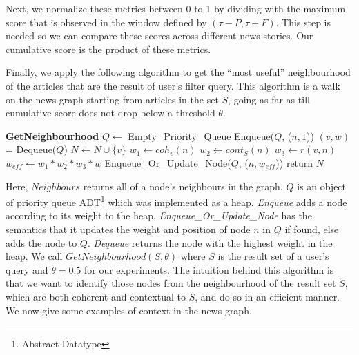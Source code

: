 Next, we normalize these metrics between 0 to 1 by dividing with the maximum score that is observed in the window defined by $(\tau - P, \tau + F)$. This
step is needed so we can compare these scores across different news stories. Our cumulative score is the product of these metrics.

Finally, we apply the following algorithm to get the ``most useful'' neighbourhood of the articles that are the result of user's filter query. This algorithm is a walk on the news graph starting from articles in the set $S$, 
going as far as till cumulative score does not drop below a threshold $\theta$.

\begin{algorithmic}
  \State \textbf{\underline{GetNeighbourhood}}
  \State {}
  \State {}
    \State $Q \leftarrow$ Empty\_Priority\_Queue
      \State Enqueue($Q$, ($n, 1$))
    \EndFor
      \State $(v, w)$ = Dequeue($Q$)
        \State $N \leftarrow N \cup \{v\}$
          \State $w_1 \leftarrow coh_{v}(n)$
          \State $w_2 \leftarrow cont_{S}(n)$
          \State $w_3 \leftarrow r(v,n)$
          \State $w_{eff} \leftarrow w_1 * w_2 * w_3 * w$
          \State Enqueue\_Or\_Update\_Node($Q$, ($n, w_{eff}$))
        \EndFor
      \EndIf
    \EndWhile
    \State return $N$
\end{algorithmic}

Here, $Neighbours$ returns all of a node's neighbours in the graph. $Q$ is an object of priority queue ADT\footnote{Abstract Datatype} which was implemented as a heap. \emph{Enqueue} adds a node according to its weight to the heap. \emph{Enqueue\_Or\_Update\_Node} has the semantics that it updates the weight and position of node $n$ in $Q$ if found, else adds the node to $Q$.
\emph{Dequeue} returns the node with the highest weight in the heap. We call $GetNeighbourhood(S, \theta)$ where $S$ is the result set of a user's query and $\theta = 0.5$ for our experiments. 
The intuition behind this algorithm is that we want to identify those nodes from the neighbourhood of the result set $S$, which are both coherent and contextual to $S$, and do so in an efficient manner.
We now give some examples of context in the news graph.

